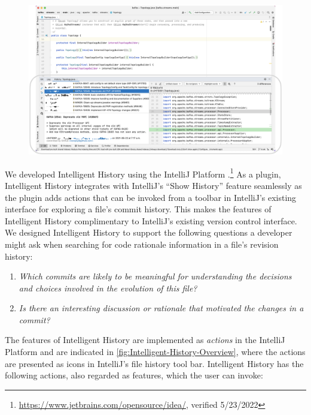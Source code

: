 \begin{figure}
    \includegraphics[width=\textwidth]{./images/intellij-overview.png}
    \caption{
    }
    \label{fig:IntelliJ-Overview}
\end{figure}

We developed Intelligent History using the IntelliJ Platform .\footnote{\url{https://www.jetbrains.com/opensource/idea/}, verified 5/23/2022}
As a plugin, Intelligent History integrates with IntelliJ's ``Show History'' feature seamlessly as the plugin adds actions that can be invoked from a toolbar in IntelliJ's existing interface for exploring a file's commit history. 
This makes the features of Intelligent History complimentary to IntelliJ's existing version control interface.
We designed Intelligent History to support the following questions a developer might ask when searching for code rationale information in a file's revision history:

\begin{enumerate}[label={(\arabic*)}]
    \item \textit{Which commits are likely to be meaningful for understanding the decisions and choices involved in the evolution of this file?}
    \item \textit{Is there an interesting discussion or rationale that motivated the changes in a commit?}
\end{enumerate}

The features of Intelligent History are implemented as \emph{actions} in the IntelliJ Platform  
and are indicated in \autoref{fig:Intelligent-History-Overview}, 
where the actions are presented as icons in IntelliJ's  file history tool bar.
Intelligent History has the following actions, also regarded as features, which the user can invoke:

